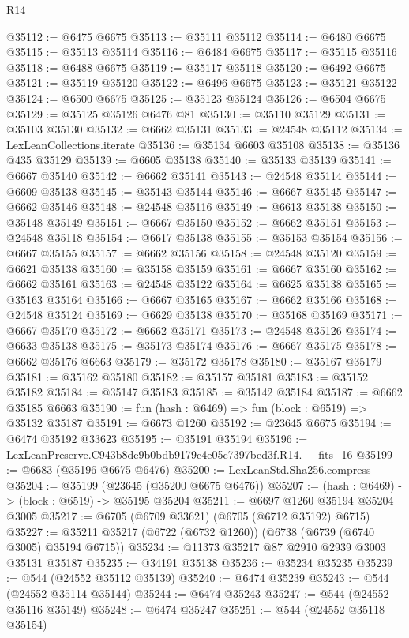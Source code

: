 \begin{lexlean}{R14}
\begin{coremodule}
@35112 := @6475 @6675
@35113 := @35111 @35112
@35114 := @6480 @6675
@35115 := @35113 @35114
@35116 := @6484 @6675
@35117 := @35115 @35116
@35118 := @6488 @6675
@35119 := @35117 @35118
@35120 := @6492 @6675
@35121 := @35119 @35120
@35122 := @6496 @6675
@35123 := @35121 @35122
@35124 := @6500 @6675
@35125 := @35123 @35124
@35126 := @6504 @6675
@35129 := @35125 @35126 @6476 @81
@35130 := @35110 @35129
@35131 := @35103 @35130
@35132 := @6662 @35131
@35133 := @24548 @35112
@35134 := LexLeanCollections.iterate
@35136 := @35134 @6603 @35108
@35138 := @35136 @435 @35129
@35139 := @6605 @35138
@35140 := @35133 @35139
@35141 := @6667 @35140
@35142 := @6662 @35141
@35143 := @24548 @35114
@35144 := @6609 @35138
@35145 := @35143 @35144
@35146 := @6667 @35145
@35147 := @6662 @35146
@35148 := @24548 @35116
@35149 := @6613 @35138
@35150 := @35148 @35149
@35151 := @6667 @35150
@35152 := @6662 @35151
@35153 := @24548 @35118
@35154 := @6617 @35138
@35155 := @35153 @35154
@35156 := @6667 @35155
@35157 := @6662 @35156
@35158 := @24548 @35120
@35159 := @6621 @35138
@35160 := @35158 @35159
@35161 := @6667 @35160
@35162 := @6662 @35161
@35163 := @24548 @35122
@35164 := @6625 @35138
@35165 := @35163 @35164
@35166 := @6667 @35165
@35167 := @6662 @35166
@35168 := @24548 @35124
@35169 := @6629 @35138
@35170 := @35168 @35169
@35171 := @6667 @35170
@35172 := @6662 @35171
@35173 := @24548 @35126
@35174 := @6633 @35138
@35175 := @35173 @35174
@35176 := @6667 @35175
@35178 := @6662 @35176 @6663
@35179 := @35172 @35178
@35180 := @35167 @35179
@35181 := @35162 @35180
@35182 := @35157 @35181
@35183 := @35152 @35182
@35184 := @35147 @35183
@35185 := @35142 @35184
@35187 := @6662 @35185 @6663
@35190 := fun (hash : @6469) => fun (block : @6519) => @35132 @35187
@35191 := @6673 @1260
@35192 := @23645 @6675
@35194 := @6474 @35192 @33623
@35195 := @35191 @35194
@35196 := LexLeanPreserve.C943b8de9b0bdb9179c4e05c7397bed3f.R14.__fits_16
@35199 := @6683 (@35196 @6675 @6476)
@35200 := LexLeanStd.Sha256.compress
@35204 := @35199 (@23645 (@35200 @6675 @6476))
@35207 := (hash : @6469) -> (block : @6519) -> @35195 @35204
@35211 := @6697 @1260 @35194 @35204 @3005
@35217 := @6705 (@6709 @33621) (@6705 (@6712 @35192) @6715)
@35227 := @35211 @35217 (@6722 (@6732 @1260)) (@6738 (@6739 (@6740 @3005) @35194 @6715))
@35234 := @11373 @35217 @87 @2910 @2939 @3003 @35131 @35187
@35235 := @34191 @35138
@35236 := @35234 @35235
@35239 := @544 (@24552 @35112 @35139)
@35240 := @6474 @35239
@35243 := @544 (@24552 @35114 @35144)
@35244 := @6474 @35243
@35247 := @544 (@24552 @35116 @35149)
@35248 := @6474 @35247
@35251 := @544 (@24552 @35118 @35154)

\end{coremodule}
\end{lexlean}
